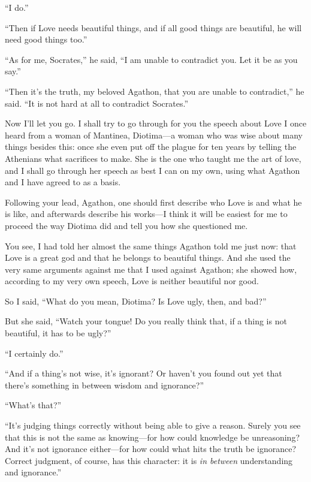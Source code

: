“I do.”

“Then if Love needs beautiful things, and if all good things are
beautiful, he will need good things too.”

“As for me, Socrates,” he said, “I am unable to contradict you. Let it
be as you say.”

“Then it’s the truth, my beloved Agathon, that you are unable to
contradict,” he said. “It is not hard at all to contradict
Socrates.”

\blank[line]

 Now I’ll let you go. I shall try to go through for you the
speech about Love I once heard from a woman of Mantinea, Diotima---a
woman who was wise about many things besides this: once she even put off
the plague for ten years by telling the Athenians what sacrifices to
make. She is the one who taught me the art of love, and I shall go
through her speech as best I can on my own, using what Agathon and I
have agreed to as a basis.

Following your lead, Agathon, one should first describe who Love is
 and what he is like, and afterwards describe his works---I think
it will be easiest for me to proceed the way Diotima did and tell you
how she questioned me.

You see, I had told her almost the same things Agathon told me just now:
that Love is a great god and that he belongs to beautiful
things. And she used
the very same arguments against me that I used against Agathon; she
showed how, according to my very own speech, Love is neither beautiful
nor good.

So I said, “What do you mean, Diotima? Is Love ugly, then, and bad?”

 But she said, “Watch your tongue! Do you really think
that, if a thing is not beautiful, it has to be ugly?”

“I certainly do.”

“And if a thing’s not wise, it’s ignorant? Or haven’t you found out yet
that there’s something in between wisdom and ignorance?”

“What’s that?”

“It’s judging things correctly without being able to give a reason.
Surely you see that this is not the same as knowing---for how could
knowledge be unreasoning? And it’s not ignorance either---for how could
what hits the truth be ignorance? Correct judgment, of course, has this
character: it is {\em in between} understanding and ignorance.”

